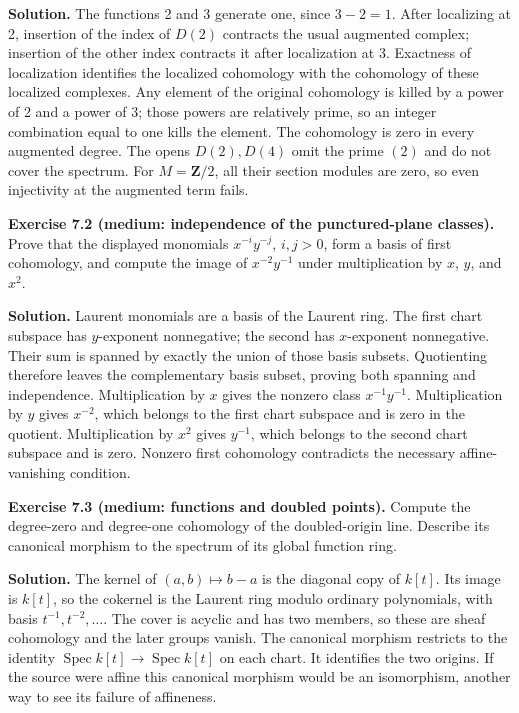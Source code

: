 \documentclass[11pt]{article}
\begin{document}
\textbf{Solution.} The functions 2 and 3 generate one, since \(3-2=1\).
After localizing at 2, insertion of the index of \(D(2)\) contracts the
usual augmented complex; insertion of the other index contracts it after
localization at 3. Exactness of localization identifies the localized
cohomology with the cohomology of these localized complexes. Any element
of the original cohomology is killed by a power of 2 and a power of 3;
those powers are relatively prime, so an integer combination equal to
one kills the element. The cohomology is zero in every augmented degree.
The opens \(D(2),D(4)\) omit the prime \((2)\) and do not cover the
spectrum. For \(M=\mathbf Z/2\), all their section modules are zero, so
even injectivity at the augmented term fails.

\textbf{Exercise 7.2 (medium: independence of the punctured-plane
classes).} Prove that the displayed monomials \(x^{-i}y^{-j}\),
\(i,j>0\), form a basis of first cohomology, and compute the image of
\(x^{-2}y^{-1}\) under multiplication by \(x\), \(y\), and \(x^2\).

\textbf{Solution.} Laurent monomials are a basis of the Laurent ring.
The first chart subspace has \(y\)-exponent nonnegative; the second has
\(x\)-exponent nonnegative. Their sum is spanned by exactly the union of
those basis subsets. Quotienting therefore leaves the complementary
basis subset, proving both spanning and independence. Multiplication by
\(x\) gives the nonzero class \(x^{-1}y^{-1}\). Multiplication by \(y\)
gives \(x^{-2}\), which belongs to the first chart subspace and is zero
in the quotient. Multiplication by \(x^2\) gives \(y^{-1}\), which
belongs to the second chart subspace and is zero. Nonzero first
cohomology contradicts the necessary affine-vanishing condition.

\textbf{Exercise 7.3 (medium: functions and doubled points).} Compute
the degree-zero and degree-one cohomology of the doubled-origin line.
Describe its canonical morphism to the spectrum of its global function
ring.

\textbf{Solution.} The kernel of \((a,b)\mapsto b-a\) is the diagonal
copy of \(k[t]\). Its image is \(k[t]\), so the cokernel is the Laurent
ring modulo ordinary polynomials, with basis \(t^{-1},t^{-2},\ldots\).
The cover is acyclic and has two members, so these are sheaf cohomology
and the later groups vanish. The canonical morphism restricts to the
identity \(\operatorname{Spec}k[t]\to\operatorname{Spec}k[t]\) on each
chart. It identifies the two origins. If the source were affine this
canonical morphism would be an isomorphism, another way to see its
failure of affineness.
\end{document}
